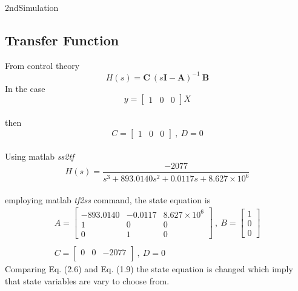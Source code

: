 \documentclass{article}
\begin{document}
\begin{homeworkProblem}{2nd}{Simulation}
\subsection{Transfer Function}
From control theory
  \begin{equation}
    H(s) = \mathbf{C} ~ (s\mathbf{I}-\mathbf{A})^{-1} ~ \mathbf{B}
  \end{equation}
In the case \\
  \begin{equation}
    y =     
    \begin{bmatrix}
      1    &  0   &   0
    \end{bmatrix} 
    X
  \end{equation}
\\then\\
  \begin{equation}
    C =     
    \begin{bmatrix}
      1    &  0   &   0
    \end{bmatrix} 
    ~ , ~ 
    D = 0
  \end{equation}
\\Using matlab \textit{ss2tf} \\
  \begin{equation}
    H(s) = \frac{-2077}{s^3+893.0140 s ^ 2 + 0.0117 s + 8.627 \times 10^6}
  \end{equation}
\\employing matlab \textit{tf2ss} command, the state equation is\\
  \begin{equation}
    \begin{gathered}
      A = 
      \begin{bmatrix}
        -893.0140  & -0.0117   & 8.627 \times 10^6                                         \\
        1          & 0         & 0                                 \\
        0          & 1         & 0
      \end{bmatrix}
      ~,~
      B = 
      \begin{bmatrix}
        1\\
        0\\
        0
      \end{bmatrix}
      \\~\\
      C = 
      \begin{bmatrix}
        0       & 0         & -2077                                         \\
      \end{bmatrix}
      ~,~
      D = 0
    \end{gathered}
  \end{equation}
  Comparing Eq. (2.6) and Eq. (1.9) the state equation is changed which imply that state variables are vary to choose from.
  

\end{homeworkProblem}
\end{document}
